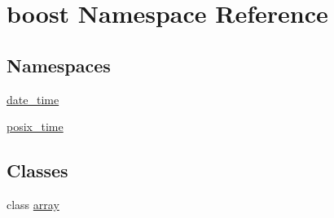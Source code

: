 \hypertarget{namespaceboost}{}\section{boost Namespace Reference}
\label{namespaceboost}
\subsection*{Namespaces}
\begin{DoxyCompactItemize}
\item 
 \hyperlink{namespaceboost_1_1date__time}{date\+\_\+time}
\item 
 \hyperlink{namespaceboost_1_1posix__time}{posix\+\_\+time}
\end{DoxyCompactItemize}
\subsection*{Classes}
\begin{DoxyCompactItemize}
\item 
class \hyperlink{classboost_1_1array}{array}
\end{DoxyCompactItemize}

